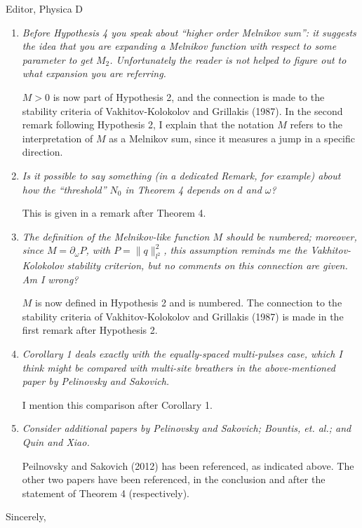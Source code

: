 \documentclass[11pt]{letter}
\begin{document}
\begin{letter}{Editor, Physica D}
\begin{enumerate}
\item \emph{Before Hypothesis 4 you speak about ``higher order Melnikov sum'': it suggests the idea that you are expanding a Melnikov function with respect to some parameter to get $M_2$. Unfortunately the reader is not helped to figure out to what expansion you are referring.}

\vspace{4mm}
$M > 0$ is now part of Hypothesis 2, and the connection is made to the stability criteria of Vakhitov-Kolokolov and Grillakis (1987). In the second remark following Hypothesis 2, I explain that the notation $M$ refers to the interpretation of $M$ as a Melnikov sum, since it measures a jump in a specific direction.
\vspace{4mm}

\item \emph{Is it possible to say something (in a dedicated Remark, for example) about how the ``threshold'' $N_0$ in Theorem 4 depends on $d$ and $\omega$?}

\vspace{4mm}
This is given in a remark after Theorem 4.
\vspace{4mm}

\item \emph{The definition of the Melnikov-like function $M$ should be numbered; moreover, since $M = \partial_\omega P$, with $P = \|q\|_{l^2}^2$, this assumption reminds me the Vakhitov-Kolokolov stability criterion, but no comments on this connection are given. Am I wrong?}

\vspace{4mm}
$M$ is now defined in Hypothesis 2 and is numbered. The connection to the stability criteria of Vakhitov-Kolokolov and Grillakis (1987) is made in the first remark after Hypothesis 2.
\vspace{4mm}

\item \emph{Corollary 1 deals exactly with the equally-spaced multi-pulses case, which I think might be compared with multi-site breathers in the above-mentioned paper by Pelinovsky and Sakovich.}

\vspace{4mm}
I mention this comparison after Corollary 1.
\vspace{4mm}

\item \emph{Consider additional papers by Pelinovsky and Sakovich; Bountis, et. al.; and Quin and Xiao.}

\vspace{4mm}
Peilnovsky and Sakovich (2012) has been referenced, as indicated above. The other two papers have been referenced, in the conclusion and after the statement of Theorem 4 (respectively).
\vspace{4mm}

\end{enumerate}

\closing{Sincerely,}

\end{letter}
\end{document}

